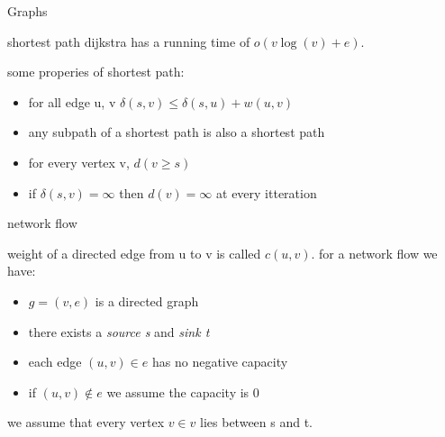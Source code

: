 \documentclass[12pt, letterpaper]{article}
\begin{document}
\begin{section}{Graphs}
\begin{subsection}{shortest path}
    dijkstra has a running time of \(o(v \log(v) + e)\).

    some properies of shortest path:
    \begin{itemize}
      \item for all edge u, v \(\delta(s, v) \leq \delta(s, u) + w(u, v)\)
      \item any subpath of a shortest path is also a shortest path
      \item for every vertex v, \(d(v \geq s)\)
      \item if \(\delta(s, v) = \infty\) then \(d(v) = \infty\) at every itteration
    \end{itemize}

  \end{subsection}

  \begin{subsection}{network flow}

    weight of a directed edge from u to v is called \(c(u, v)\).
    for a network flow we have:
    \begin{itemize}
      \item \(g = (v, e)\) is a directed graph
      \item there exists a \emph{source s} and \emph{sink t}
      \item each edge \((u, v) \in e\) has no negative capacity
      \item if \((u, v) \notin e\) we assume the capacity is 0
    \end{itemize}
    we assume that every vertex \(v \in v\) lies between s and t.


\end{subsection}
\end{section}
\end{document}
